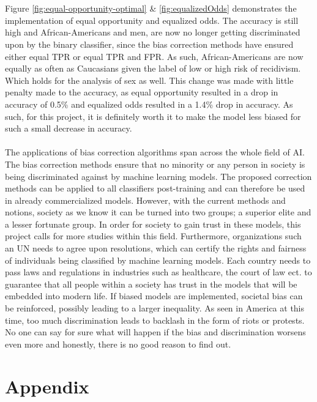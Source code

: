 \documentclass[11pt, fleqn, titlepage]{article}
\begin{document}
	\\\\
	Figure \ref{fig:equal-opportunity-optimal} \& \ref{fig:equalizedOdds} demonstrates the implementation of equal opportunity and equalized odds. The accuracy is still high and African-Americans and men, are now no longer getting discriminated upon by the binary classifier, since the bias correction methods have ensured either equal TPR or equal TPR and FPR. As such, African-Americans are now equally as often as Caucasians given the label of low or high risk of recidivism. Which holds for the analysis of sex as well. This change was made with little penalty made to the accuracy, as equal opportunity resulted in a drop in accuracy of 0.5\% and equalized odds resulted in a 1.4\% drop in accuracy. As such, for this project, it is definitely worth it to make the model less biased for such a small decrease in accuracy. 
	\\\\
	The applications of bias correction algorithms span across the whole field of AI. The bias correction methods ensure that no minority or any person in society is being discriminated against by machine learning models. The proposed correction methods can be applied to all classifiers post-training and can therefore be used in already commercialized models. However, with the current methods and notions, society as we know it can be turned into two groups; a superior elite and a lesser fortunate group. In order for society to gain trust in these models, this project calls for more studies within this field. Furthermore, organizations such an UN needs to agree upon resolutions, which can certify the rights and fairness of individuals being classified by machine learning models. Each country needs to pass laws and regulations in industries such as healthcare, the court of law ect. to guarantee that all people within a society has trust in the models that will be embedded into modern life. If biased models are implemented, societal bias can be reinforced, possibly leading to a larger inequality. As seen in America at this time, too much discrimination leads to backlash in the form of riots or protests. No one can say for sure what will happen if the bias and discrimination worsens even more and honestly, there is no good reason to find out.
	
	
	\section{Appendix} \label{appendix}
	
\end{document}

